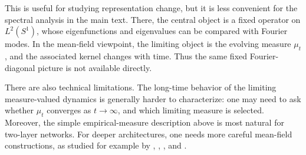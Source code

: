 This is useful for studying representation change, but it is less convenient
for the spectral analysis in the main text. There, the central object is a
fixed operator on \(L^2(S^1)\), whose eigenfunctions and eigenvalues can be
compared with Fourier modes. In the mean-field viewpoint, the limiting object is
the evolving measure \(\mu_t\), and the associated kernel changes with time.
Thus the same fixed Fourier-diagonal picture is not available directly.

There are also technical limitations. The long-time behavior of the limiting
measure-valued dynamics is generally harder to characterize: one may need to
ask whether \(\mu_t\) converges as \(t\to\infty\), and which limiting measure is
selected. Moreover, the simple empirical-measure description above is most
natural for two-layer networks. For deeper architectures, one needs more
careful mean-field constructions, as studied for example by
\citet{nguyen2019meanfieldlimitlearning},
\citet{araujo2019meanfieldlimitcertaindeep},
\citet{sirignano2019meanfieldanalysisneural}, and
\citet{nguyen2023rigorousframeworkmeanfield}.
